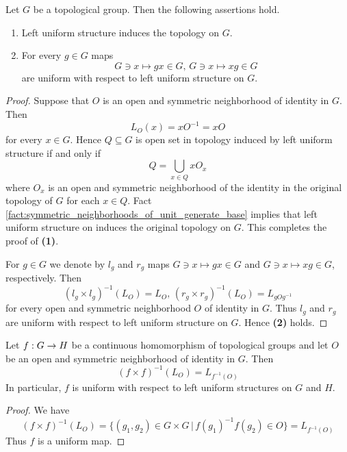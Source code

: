 \documentclass[10pt]{amsart}
\begin{document}
\begin{proposition}\label{proposition:left_uniform_structure_on_topological_group}
	Let $G$ be a topological group. Then the following assertions hold.
	\begin{enumerate}[label=\emph{\textbf{(\arabic*)}}, leftmargin=3.0em]
		\item Left uniform structure induces the topology on $G$.
		\item For every $g \in G$ maps
		      $$G\ni x \mapsto gx \in G,\,G\ni x \mapsto xg \in G$$
		      are uniform with respect to left uniform structure on $G$.
	\end{enumerate}
\end{proposition}
\begin{proof}
	Suppose that $O$ is an open and symmetric neighborhood of identity in $G$. Then
	$$L_O(x) = xO^{-1} = xO$$
	for every $x \in G$. Hence $Q \subseteq G$ is open set in topology induced by left uniform structure if and only if
	$$Q = \bigcup_{x\in Q}xO_x$$
	where $O_x$ is an open and symmetric neighborhood of the identity in the original topology of $G$ for each $x \in Q$. Fact \ref{fact:symmetric_neighborhoods_of_unit_generate_base} implies that left uniform structure on induces the original topology on $G$. This completes the proof of \textbf{(1)}.

	For $g \in G$ we denote by $l_g$ and $r_g$ maps $G \ni x \mapsto gx \in G$ and $G \ni x \mapsto xg \in G$, respectively. Then
	$$\left(l_g\times l_g\right)^{-1}(L_O) = L_O,\,\left(r_g \times r_g\right)^{-1}(L_O) = L_{gOg^{-1}}$$
	for every open and symmetric neighborhood $O$ of identity in $G$. Thus $l_g$ and $r_g$ are uniform with respect to left uniform structure on $G$. Hence \textbf{(2)} holds.
\end{proof}

\begin{fact}\label{fact:each_continuous_homomorphism_is_uniform_with_respect_to_left_uniformity}
	Let $f:G\rightarrow H$ be a continuous homomorphism of topological groups and let $O$ be an open and symmetric neighborhood of identity in $G$. Then
	$$\left(f\times f\right)^{-1}(L_O) = L_{f^{-1}(O)}$$
	In particular, $f$ is uniform with respect to left uniform structures on $G$ and $H$.
\end{fact}
\begin{proof}
	We have
	$$\left(f\times f\right)^{-1}(L_O) = \big\{(g_1, g_2) \in G\times G\,\big|\,f(g_1)^{-1}f(g_2) \in O\big\} = L_{f^{-1}(O)}$$
	Thus $f$ is a uniform map.
\end{proof}
\end{document}
